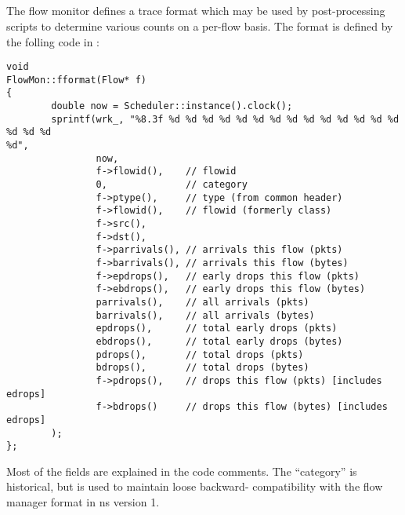 \subsection{}

The flow monitor defines a trace format which may be used by post-processing
scripts to determine various counts on a per-flow basis.
The format is defined by the folling code in :
\begin{small}
\begin{verbatim}
void
FlowMon::fformat(Flow* f)
{   
        double now = Scheduler::instance().clock();
        sprintf(wrk_, "%8.3f %d %d %d %d %d %d %d %d %d %d %d %d %d %d %d %d %d 
%d", 
                now,    
                f->flowid(),    // flowid
                0,              // category
                f->ptype(),     // type (from common header) 
                f->flowid(),    // flowid (formerly class)
                f->src(),
                f->dst(),
                f->parrivals(), // arrivals this flow (pkts)
                f->barrivals(), // arrivals this flow (bytes) 
                f->epdrops(),   // early drops this flow (pkts)
                f->ebdrops(),   // early drops this flow (bytes) 
                parrivals(),    // all arrivals (pkts)
                barrivals(),    // all arrivals (bytes) 
                epdrops(),      // total early drops (pkts)
                ebdrops(),      // total early drops (bytes) 
                pdrops(),       // total drops (pkts)
                bdrops(),       // total drops (bytes) 
                f->pdrops(),    // drops this flow (pkts) [includes edrops] 
                f->bdrops()     // drops this flow (bytes) [includes edrops]
        );
};  
\end{verbatim}
\end{small}

Most of the fields are explained in the code comments.
The ``category'' is historical, but is used to maintain loose backward-
compatibility with the flow manager format in ns version 1.

\subsection{}

